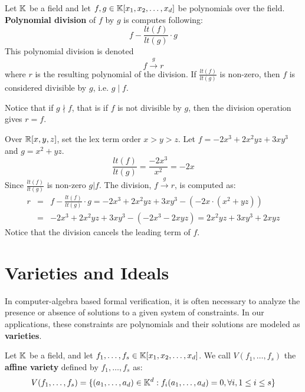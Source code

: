 \begin{Definition}
Let ${\mathbb{K}}$ be a field and let $f, g \in {\mathbb{K}}[x_1, x_2, \ldots, x_d]$ be polynomials
over the field. {\bf Polynomial division} of $f$ by $g$ is computes following:
\begin{equation}
f-\frac{lt(f)}{lt(g)}\cdot g
\end{equation}
This polynomial division is denoted
\begin{equation}
f\xrightarrow{g} r
\end{equation}
where $r$ is the resulting polynomial of the division.
If $\frac{lt(f)}{lt(g)}$ is non-zero, then $f$ is considered divisible by $g$, 
i.e. $g \mid f$.
\end{Definition}
Notice that if $g \nmid f$, that is if $f$ is not divisible by $g$,
then the division operation gives $r = f$.
\begin{Example}
Over ${\mathbb{R}}[x,y,z]$, set the lex term order $x > y > z$.
Let $f = -2x^3 + 2x^2yz + 3xy^3$ and $g = x^2+yz$.
\begin{equation}
\frac{lt(f)}{lt(g)} = \frac{-2x^3}{x^2} = -2x
\end{equation}
Since $\frac{lt(f)}{lt(g)}$ is non-zero $g|f$. The division, $f\xrightarrow{g} r$, 
is computed as:
\begin{eqnarray}
r &=& f-\frac{lt(f)}{lt(g)}\cdot g = -2x^3 + 2x^2yz + 3xy^3 - (-2x \cdot (x^2+yz)) \nonumber \\
&=& -2x^3 + 2x^2yz + 3xy^3 - (-2x^3-2xyz) = 2x^2yz + 3xy^3 + 2xyz
\end{eqnarray}
Notice that the division cancels the leading term of $f$.
\end{Example}

\section{Varieties and Ideals}
In computer-algebra based formal verification,
it is often necessary to analyze the presence 
or absence of solutions to a given system of constraints.
In our applications, these constraints are polynomials and their solutions 
are modeled as {\bf varieties}.

\begin{Definition}
Let ${\mathbb{K}}$ be a field, and let $f_1, \ldots, f_s 
\in {\mathbb{K}}[x_1, x_2, \ldots, x_d]$. 
We call $V(f_1, \dots, f_s)$ the {\bf affine variety} 
defined by $f_1, \dots, f_s$ as:
\begin{equation}
V(f_1, \ldots, f_s)= \{(a_1, \ldots, a_{d})\in {\mathbb{K}}^d:f_i(a_1, \ldots, a_d)=0, \forall{i},1\le i \le s\}
\end{equation}
\end{Definition}

